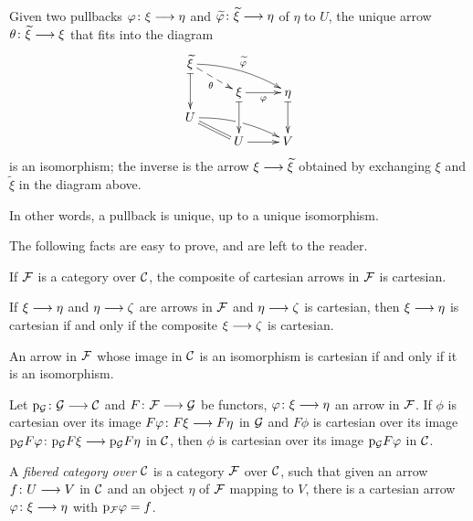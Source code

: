 \begin{3   FIBERED CATEGORIES}
\begin{3.1 Fibered categories}
\begin{remark}
Given two pullbacks $\phi\colon \xi \arr \eta$ and $\widetilde\phi \colon \widetilde\xi \arr \eta $ of $\eta$ to $U$, the unique arrow $\theta\colon \widetilde \xi \arr \xi$ that fits into the diagram
   \[
   \xymatrix@R=6pt{
   {\widetilde\xi}\ar@{|->}[dd]\ar@{-->}[rd]_\theta
   \ar@/^/[rrd]^{\widetilde\phi} \\
   & {}\xi\ar@{|->}[dd]\ar[r]_{\phi}
   &{}\eta\ar@{|->}[dd] \\
   U\ar@{=}[rd]\ar@/^/[rrd]|(.482)\hole\\
   & U \ar[r] & V
   }
   \]
is an isomorphism; the inverse is the arrow $\xi \arr \widetilde{\xi}$ obtained by exchanging $\xi$ and $\widetilde{\xi}$ in the diagram above.

In other words, a pullback is unique, up to a unique isomorphism.
\end{remark}

The following facts are easy to prove, and are left to the reader.

\begin{proposition}
\hfil
\begin{enumeratei}

 If $\mathcal{F}$ is a category over $\mathcal{C}$, the composite of cartesian arrows in $\mathcal{F}$ is cartesian.

 If $\xi \arr \eta$ and $\eta \arr \zeta$ are arrows in $\mathcal{F}$ and $\eta \arr\zeta$ is cartesian, then $\xi \arr\eta$ is cartesian if and only if the composite $\xi \arr \zeta$ is cartesian.

 An arrow in $\mathcal{F}$ whose image in $\mathcal{C}$ is an isomorphism is cartesian if and only if it is an isomorphism.

 Let $\p_{\cG}\colon \cG \arr \cC$ and $F \colon \cF \arr \cG$ be functors, $\phi \colon \xi \arr \eta$ an arrow in $\mathcal{F}$. If $\phi$ is cartesian over its image $F \phi \colon F \xi \arr F \eta$ in $\mathcal{G}$ and $F \phi$ is cartesian over its image $\p_{\cG}F\phi \colon \p_{\cG}F\xi \arr \p_{\cG}F \eta$ in $\mathcal{C}$, then $\phi$ is cartesian over its image $\mathrm{p}_{\mathcal{G}}F\varphi$ in $\mathcal{C}$.
\end{enumeratei}
\end{proposition}

\begin{definition} A \emph{fibered category over $\mathcal{C}$}%
%
 is a category $\mathcal{F}$ over $\mathcal{C}$, such that given an arrow $f \colon U \arr V$ in $\mathcal{C}$ and an object $\eta$ of $\mathcal{F}$ mapping to $V$, there is a cartesian arrow $\phi\colon \xi \arr \eta$ with $\mathrm{p}_{\mathcal{F}} \varphi = f$.
\end{definition}


\end{3.1 Fibered categories}
\end{3   FIBERED CATEGORIES}
